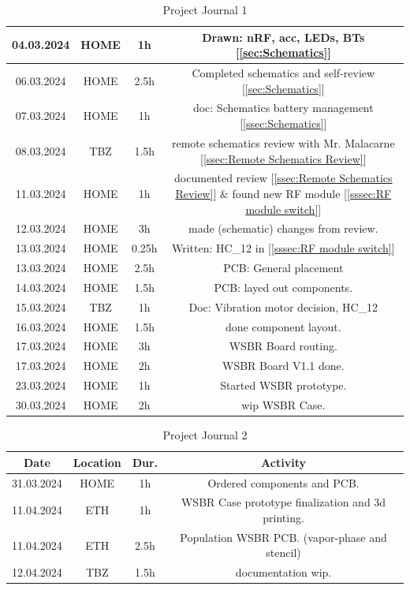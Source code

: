 \begin{table}[H]
\begin{tabular}{||c | c | c || c||}
 \hline
    04.03.2024 & HOME & 1h & Drawn: nRF, acc, LEDs, BTs [\ref{sec:Schematics}] \\ 
 \hline
    06.03.2024 & HOME & 2.5h & Completed schematics and self-review [\ref{sec:Schematics}] \\ 
 \hline
    07.03.2024 & HOME & 1h & doc: Schematics battery management [\ref{ssec:Schematics}] \\ 
 \hline
     08.03.2024 & TBZ & 1.5h & remote schematics review with Mr. Malacarne [\ref{ssec:Remote Schematics Review}] \\ 
 \hline
     11.03.2024 & HOME & 1h & documented review [\ref{ssec:Remote Schematics Review}] \& found new RF module [\ref{sssec:RF module switch}] \\ 
 \hline
     12.03.2024 & HOME & 3h & made (schematic) changes from review. \\ 
 \hline
     13.03.2024 & HOME & 0.25h & Written: HC\_12 in [\ref{sssec:RF module switch}] \\ 
 \hline
     13.03.2024 & HOME & 2.5h & PCB: General placement \\ 
 \hline
     14.03.2024 & HOME & 1.5h & PCB: layed out components. \\ 
 \hline
     15.03.2024 & TBZ & 1h & Doc: Vibration motor decision, HC\_12\\ 
 \hline
     16.03.2024 & HOME & 1.5h & done component layout. \\ 
 \hline
     17.03.2024 & HOME & 3h & WSBR Board routing. \\ 
 \hline
     17.03.2024 & HOME & 2h & WSBR Board V1.1 done. \\ 
 \hline
     23.03.2024 & HOME & 1h & Started WSBR prototype. \\ 
 \hline
     30.03.2024 & HOME & 2h & wip WSBR Case. \\ 
 \hline
\end{tabular}
    \caption{Project Journal 1}
    \label{tab:Project Journal 1}
\end{table}




\begin{table}[H]
    \centering
\begin{tabular}{||c | c | c || c||} 
 \hline
 Date &  Location & Dur. & Activity \\ [0.5ex] 
 \hline\hline
     31.03.2024 & HOME & 1h & Ordered components and PCB. \\ 
 \hline
     11.04.2024 & ETH & 1h & WSBR Case prototype finalization and 3d printing. \\ 
 \hline
     11.04.2024 & ETH & 2.5h & Population WSBR PCB. (vapor-phase and stencil)\\ 
 \hline
     12.04.2024 & TBZ & 1.5h & documentation wip. \\ 
 \hline
\end{tabular}
    \caption{Project Journal 2}
    \label{tab:Project Journal 2}
\end{table}
